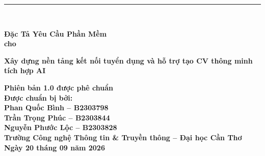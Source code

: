 
\begin{titlepage}
    
    \vspace*{0.25cm}

    \noindent\rule{\textwidth}{4pt} \\[0cm]

    \begin{flushright}
        
        {\fontsize{32pt}{28pt}\selectfont \bfseries Đặc Tả Yêu Cầu Phần Mềm} \\[1.5cm]

        {\Large\bfseries cho} \\[1cm]

        {\fontsize{32pt}{32pt}\selectfont \bfseries Xây dựng nền tảng kết nối tuyển dụng và hỗ trợ tạo CV thông minh tích hợp AI \par}

        \vspace{1.8cm}

        {\bfseries Phiên bản 1.0 được phê chuẩn} \\[1.2cm]

        {\bfseries Được chuẩn bị bởi:} \\[0.2cm]
        {\bfseries Phan Quốc Bình -- B2303798} \\
        {\bfseries Trần Trọng Phúc -- B2303844} \\
        {\bfseries Nguyễn Phước Lộc -- B2303828} \\[1.2cm]

        {\bfseries Trường Công nghệ Thông tin \& Truyền thông -- Đại học Cần Thơ} \\[1.2cm]

        {\bfseries Ngày 20 tháng 09 năm 2026}

    \end{flushright}

\end{titlepage}